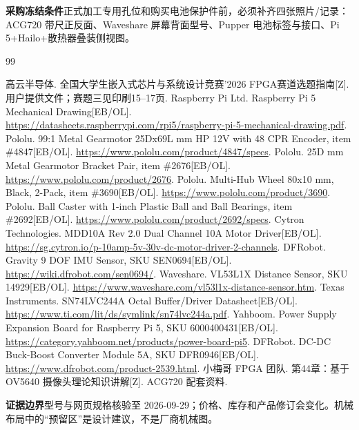 \documentclass[UTF8,a4paper,zihao=-4,fontset=none]{ctexart}
\newcommand{\note}[2]{\par\smallskip\noindent\colorbox{Pale}{\parbox{\dimexpr\linewidth-2\fboxsep\relax}{\small\textbf{\color{Teal}#1}\quad #2}}\par\smallskip}
\begin{document}
\note{采购冻结条件}{正式加工专用孔位和购买电池保护件前，必须补齐四张照片/记录：ACG720 带尺正反面、Waveshare 屏幕背面型号、Pupper 电池标签与接口、Pi 5+Hailo+散热器叠装侧视图。}

\begin{thebibliography}{99}\small\raggedright
{} 高云半导体. 全国大学生嵌入式芯片与系统设计竞赛'2026 FPGA赛道选题指南[Z]. 用户提供文件；赛题三见印刷15--17页.
 Raspberry Pi Ltd. Raspberry Pi 5 Mechanical Drawing[EB/OL]. \url{https://datasheets.raspberrypi.com/rpi5/raspberry-pi-5-mechanical-drawing.pdf}.
 Pololu. 99:1 Metal Gearmotor 25Dx69L mm HP 12V with 48 CPR Encoder, item \#4847[EB/OL]. \url{https://www.pololu.com/product/4847/specs}.
 Pololu. 25D mm Metal Gearmotor Bracket Pair, item \#2676[EB/OL]. \url{https://www.pololu.com/product/2676}.
 Pololu. Multi-Hub Wheel 80x10 mm, Black, 2-Pack, item \#3690[EB/OL]. \url{https://www.pololu.com/product/3690}.
 Pololu. Ball Caster with 1-inch Plastic Ball and Ball Bearings, item \#2692[EB/OL]. \url{https://www.pololu.com/product/2692/specs}.
 Cytron Technologies. MDD10A Rev 2.0 Dual Channel 10A Motor Driver[EB/OL]. \url{https://sg.cytron.io/p-10amp-5v-30v-dc-motor-driver-2-channels}.
 DFRobot. Gravity 9 DOF IMU Sensor, SKU SEN0694[EB/OL]. \url{https://wiki.dfrobot.com/sen0694/}.
 Waveshare. VL53L1X Distance Sensor, SKU 14929[EB/OL]. \url{https://www.waveshare.com/vl53l1x-distance-sensor.htm}.
 Texas Instruments. SN74LVC244A Octal Buffer/Driver Datasheet[EB/OL]. \url{https://www.ti.com/lit/ds/symlink/sn74lvc244a.pdf}.
 Yahboom. Power Supply Expansion Board for Raspberry Pi 5, SKU 6000400431[EB/OL]. \url{https://category.yahboom.net/products/power-board-pi5}.
 DFRobot. DC-DC Buck-Boost Converter Module 5A, SKU DFR0946[EB/OL]. \url{https://www.dfrobot.com/product-2539.html}.
 小梅哥 FPGA 团队. 第44章：基于 OV5640 摄像头理论知识讲解[Z]. ACG720 配套资料.
\end{thebibliography}

\note{证据边界}{型号与网页规格核验至 2026-09-29；价格、库存和产品修订会变化。机械布局中的“预留区”是设计建议，不是厂商机械图。}
\end{document}
